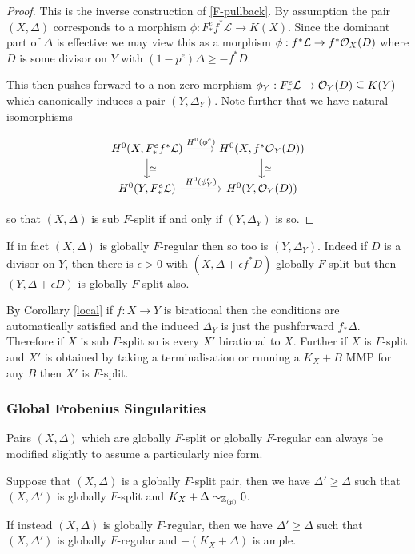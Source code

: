 \begin{proof}
	
	This is the inverse construction of \autoref{F-pullback}. By assumption the pair $(X,\Delta)$ corresponds to a morphism $\phi\colon F_{*}^{e}f^{*}\mathcal{L} \to K(X)$. Since the dominant part of $\Delta$ is effective we may view this as a morphism $\phi: f^{*}\mathcal{L} \to f^{*}\ox(D)$ where $D$ is some divisor on $Y$ with $(1-p^{e}) \Delta \geq -f^{*}D$.
	
	This then pushes forward to a non-zero morphism $\phi_{Y}:F_{*}^{e}\mathcal{L} \to \ox[Y](D) \subseteq K(Y)$ which canonically induces a pair $(Y,\Delta_{Y})$. Note further that we have natural isomorphisms

	\[\begin{tikzcd}
	{H^{0}(X,F_{*}^{e}f^{*}\mathcal{L})} \arrow[r, "H^{0}(\phi^{e})"] \arrow[d, "\simeq "] & {H^{0}(X,f^{*}\ox[Y](D))} \arrow[d, "\simeq"] \\
	{H^{0}(Y,F_{*}^{e}\mathcal{L})} \arrow[r, "H^{0}(\phi_{Y}^{e})"]                       & {H^{0}(Y,\ox[Y](D))}                         
	\end{tikzcd}\]
	
	so that $(X,\Delta)$ is sub $F$-split if and only if $(Y,\Delta_{Y})$ is so.	
\end{proof}

If in fact $(X,\Delta)$ is globally $F$-regular then so too is $(Y,\Delta_{Y})$. Indeed if $D$ is a divisor on $Y$, then there is $\epsilon > 0$ with $(X,\Delta+\epsilon f^{*}D)$ globally $F$-split but then $(Y,\Delta+\epsilon D)$ is globally $F$-split also.

By Corollary \ref{local} if $f\colon X \to Y$ is birational then the conditions are automatically satisfied and the induced $\Delta_{Y}$ is just the pushforward $f_{*}\Delta$. Therefore if $X$ is sub $F$-split so is every $X'$ birational to $X$. Further if $X$ is $F$-split and $X'$ is obtained by taking a terminalisation or running a $K_{X}+B$ MMP for any $B$ then $X'$ is $F$-split.

\subsubsection{Global Frobenius Singularities}

Pairs $(X,\Delta)$ which are globally $F$-split or globally $F$-regular can always be modified slightly to assume a particularly nice form.

\begin{lemma}
	
	Suppose that $(X,\Delta)$ is a globally $F$-split pair, then we have $\Delta' \geq \Delta$ such that $(X,\Delta')$ is globally $F$-split and $K_{X}+\Delta \sim_{\zp} 0 $.
	
	If instead $(X,\Delta)$ is globally $F$-regular, then we have $\Delta' \geq \Delta$ such that $(X,\Delta')$ is globally $F$-regular and $-(K_{X}+\Delta)$ is ample.
	
	\end{lemma}

